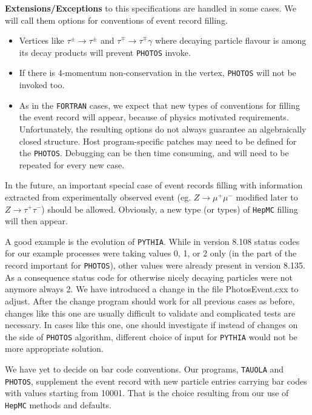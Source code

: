 \documentclass[]{Photos_interface_design}
\begin{document}
\noindent
\textbf{ Extensions/Exceptions} to this specifications  are handled in some cases. We will call them
options for conventions of event record filling.
  \begin{itemize} 
    \item  Vertices like $\tau^\pm \rightarrow \tau^\pm$ and $\tau^\mp \rightarrow \tau^\mp \gamma$ 
           where decaying particle flavour is among its decay products will prevent  {\tt PHOTOS} invoke.

    \item  If there is  4-momentum non-conservation in the vertex,
           {\tt PHOTOS} will not be invoked too.

    \item
           As in the {\tt FORTRAN} cases, we expect that  new  types of 
           conventions for filling the event record
           will appear, because of physics motivated requirements.
           Unfortunately, the resulting options do not always guarantee
           an algebraically closed structure.  
           Host program-specific patches may need to be defined for the 
           {\tt PHOTOS}. 
           Debugging can be then  time consuming, and will need to be repeated for every new
           case.
   \end{itemize}


 In the future,  an important special case of event records filling with
information extracted from experimentally observed event (eg. $Z\to \mu^+\mu^-$
 modified later to $Z\to \tau^+\tau^-$) should be allowed.
  Obviously, a new type (or types) of {\tt HepMC} filling will then appear.

A good example is the evolution of {\tt PYTHIA}. While in version 8.108 status codes for 
our example processes were  taking values 0, 1, or 2  only (in the part of the record 
important for {\tt PHOTOS}), other values were already present in
version 8.135. As a consequence status code for 
otherwise nicely decaying particles were not anymore  always 2. We have introduced 
a change  in the file PhotosEvent.cxx to adjust. After  the change
program should work for all previous cases as before, 
changes like this one are usually difficult to validate
and complicated  tests are necessary. In cases like this one, one should  investigate 
if instead of changes on the side of  {\tt PHOTOS} algorithm, different choice of  input for {\tt PYTHIA} would not 
be more appropriate 
solution.

We have yet to decide on bar code conventions. Our programs, {\tt TAUOLA} and
 {\tt PHOTOS}, supplement the event record with new particle entries carrying bar codes 
with values starting from 10001. That is the choice resulting from our use 
of {\tt HepMC} methods and defaults.  
\end{document}
